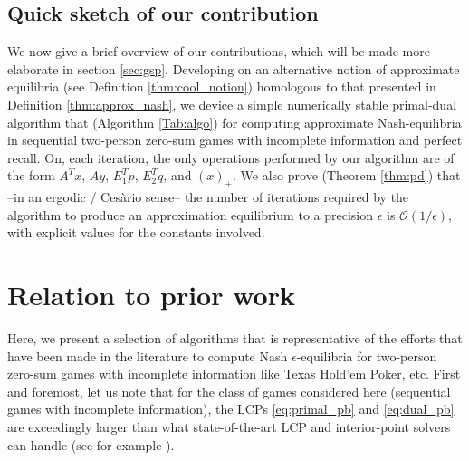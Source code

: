 \documentclass[a4paper,9pt]{extarticle}
\DeclareMathOperator{\proj}{proj}
\begin{document}
\subsection{Quick sketch of our contribution}
We now give a brief overview of our contributions, which will be made
more elaborate in section \ref{sec:gsp}.
Developing on an alternative notion of approximate equilibria (see
Definition \ref{thm:cool_notion})
homologous to that presented in Definition \ref{thm:approx_nash}, we
device a simple numerically stable primal-dual algorithm that
(Algorithm \ref{Tab:algo}) for computing approximate Nash-equilibria
in sequential two-person zero-sum games with incomplete information and
perfect recall. On, each iteration, the only operations performed by
our algorithm are of the form $A^Tx$, $Ay$, $E_1^Tp$, $E_2^Tq$, and
$(x)_+$. We also prove (Theorem \ref{thm:pd}) that --in an ergodic /
Ces\`ario sense-- the number of iterations required by the algorithm
to produce an approximation equilibrium to a precision $\epsilon$ is
$\mathcal{O}(1/\epsilon)$, with explicit values for the constants
involved.


\section{Relation to prior work}
\label{sec:related_work}
Here, we present a selection of algorithms that is representative of the
efforts that have been made in the literature to compute Nash
$\epsilon$-equilibria for two-person zero-sum games with incomplete
information like Texas Hold'em Poker, etc.
First and foremost, let us note that for the class of games considered
here (sequential games with incomplete information), the LCPs
\eqref{eq:primal_pb} and \eqref{eq:dual_pb} are exceedingly larger
than what state-of-the-art LCP and interior-point solvers can
handle (see for example \cite{hoda2010smoothing,gilpinfirst}).
\end{document}
